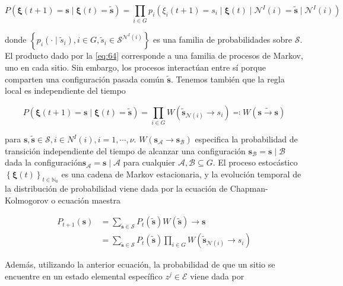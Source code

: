 \begin{equation}\label{eq:64}
	P(\bm{\xi}(t+1)=\mathbf{s} \mid \bm{\xi}(t)=\tilde{\mathbf{s}}) = \prod_{i\in G}  {p_i\left(\xi_i(t+1)=s_i \mid  \bm{\xi}(t)\mid  \mathcal{N}^I(i) = \tilde{\mathbf{s}}\mid \mathcal{N}^I(i)   \right)}
\end{equation}

donde $\left\{p_i(\cdot\mid\tilde{s}_i),i\in G, \tilde{s}_i\in\mathcal{S}^{\mathcal{N}^I(i)}\right\}$ es una familia de probabilidades sobre $\mathcal{S}$. El producto  dado por la \cref{eq:64} corresponde a una familia de procesos de Markov, uno en cada sitio. Sin embargo, los procesos interactúan entre sí porque comparten una configuración pasada común $\tilde{\mathbf{s}}$. Tenemos también que la regla local es independiente del tiempo

\begin{equation}\label{eq:65}
	P(\bm{\xi}(t+1)=\mathbf{s} \mid \bm{\xi}(t)=\tilde{\mathbf{s}}) = 	\prod_{i\in G}  {W\left(\tilde{\mathbf{s}}_{\mathcal{N}(i)}\to s_i\right)} \eqqcolon W\left(\tilde{\mathbf{s}\to\mathbf{s}}\right)
\end{equation}


para $\mathbf{s} , \tilde{\mathbf{s}}  \in \mathcal{S}, i \in N^I(i), i = 1, \cdots , \nu$. $W\left(\mathbf{s}_{\mathcal{A}}\to\mathbf{s}_\mathcal{B}\right)$ especifica la probabilidad de transición independiente del tiempo de alcanzar una configuración $\mathbf{s}_\mathcal{B} = \mathbf{s}\mid \mathcal{B}$  dada la configuración$\mathbf{s}_\mathcal{A} = \mathbf{s}\mid \mathcal{A}$ para cualquier $\mathcal{A}, \mathcal{B} \subseteq G$. El proceso estocástico  $\left\{\bm{\xi}(t)\right\}_{t\in\mathbb{N}_0}$  es una cadena de Markov estacionaria, y la evolución temporal de la distribución de probabilidad viene dada por la ecuación de Chapman-Kolmogorov o ecuación maestra

\begin{align}\label{eq:66}
	P_{t+1}(\mathbf{s}) &=  \sum_{\tilde{\mathbf{s}}\in\mathcal{S}}{P_t(\tilde{\mathbf{s}})W(\tilde{\mathbf{s}})\to\mathbf{s}}\\
	&= \sum_{\tilde{\mathbf{s}}\in\mathcal{S}}{P_t}{(\tilde{\mathbf{s}})\prod_{i\in G} {W\left(\tilde{\mathbf{s}}_{\mathcal{N}(i)}\to s_i\right)}}
\end{align}

Además, utilizando la anterior ecuación, la probabilidad de que un sitio se encuentre en un estado elemental específico $z^j \in \mathcal{E}$ viene dada por 

